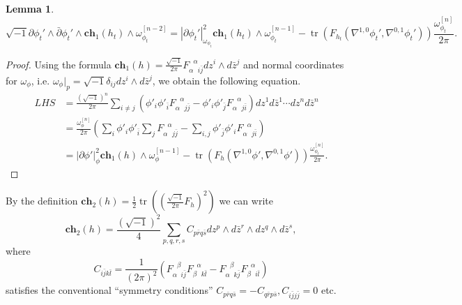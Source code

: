 \documentclass[10pt, letterpaper]{amsart}
\newcommand{\tr}{\operatorname{tr}}
\theoremstyle{plain}
\newtheorem{lemma}[theorem]{Lemma}
\theoremstyle{definition}
\numberwithin{equation}{section}
\begin{document}
\begin{lemma}	
	\label{lem:firstChern}
	\[
	\sqrt{-1}\partial\phi_t'\wedge \bar\partial \phi_t'\wedge \mathbf{ch}_1\left(h_t\right)\wedge \omega_{\phi_t}^{[n-2]}
	=
	\left|\partial \phi_t'\right|_{\omega_{\phi_t}}^2 \mathbf{ch}_1\left(h_t\right)\wedge \omega_{\phi_t}^{[n-1]}
	- 
 \tr \left( F_{h_t}\left(\nabla^{1,0}\phi_t', \nabla^{0,1}\phi_t'\right)\right)\frac{\omega_{\phi_t}^{[n]}}{2\pi }.
	\]
\end{lemma}

\begin{proof}
	Using the formula $\mathbf{ch}_1\left(h\right)= \frac{\sqrt{-1}}{2\pi} F_{\alpha\phantom{\alpha}i\bar j}^{\phantom{\alpha}\alpha}dz^i\wedge d\bar z^j$  and normal coordinates for $\omega_\phi$, i.e. $\omega_{\phi}|_p=\sqrt{-1}\delta_{ij}dz^i\wedge d\bar z^j$, we obtain the following equation.
	\begin{align*}
	LHS
	& = \frac{\left(\sqrt{-1}\right)^n}{2\pi}\sum_{i\neq j}\left( \phi'_i\phi'_{\bar i} F_{\alpha\phantom{\alpha}j\bar j}^{\phantom{\alpha}\alpha}
	-\phi'_i\phi'_{\bar j}F_{\alpha\phantom{\alpha}j\bar i}^{\phantom{\alpha}\alpha}
	\right)dz^1d\bar z^1\cdots dz^nd\bar z^n\\
	& = 
	\frac{\omega_\phi^{[n]}}{2\pi }
	\left( 
	\sum_i \phi'_i \phi'_{\bar i} \sum_j F_{\alpha\phantom{\alpha}j\bar j}^{\phantom{\alpha}\alpha}
	-
	\sum_{i,j}
	\phi'_{\bar j} \phi'_iF_{\alpha\phantom{\alpha}j\bar i}^{\phantom{\alpha}\alpha}\right)\\
	& = 
	\left|\partial \phi'\right|_{\phi}^2 \mathbf{ch}_1\left(h\right)\wedge \omega_{\phi}^{[n-1]}
	- 
	\tr \left( F_{h}\left(\nabla^{1,0}\phi',\nabla^{0,1}\phi'\right)\right) \frac{\omega_{\phi_t}^{[n]}}{2\pi }.
	\end{align*}
\end{proof}

By the definition $\mathbf{ch}_2\left(h\right)=\frac{1}{2}\tr \left(\left(\frac{\sqrt{-1}}{2\pi}F_{h}\right)^2\right)$ we can write
\[
\mathbf{ch}_2\left(h\right)
= 
\frac{\left(\sqrt{-1}\right)^2}{4}\sum_{p,q,r,s} C_{p\bar rq\bar s}dz^p\wedge d\bar z^r\wedge dz^q \wedge d\bar z^s,
\]
where
\[
C_{i\bar j k\bar l}
= 
\frac{1}{\left(2\pi\right)^2} 
\left( F_{\alpha\phantom{\beta}i\bar j}^{\phantom{\alpha}\beta}
F_{\beta\phantom{\alpha}k\bar l}^{\phantom{\beta}\alpha}
- 
F_{\alpha\phantom{\beta}k\bar j}^{\phantom{\alpha}\beta}
F_{\beta\phantom{\alpha}i\bar l}^{\phantom{\beta}\alpha}\right)
\]
satisfies the conventional ``symmetry conditions'' $C_{p\bar r q\bar s}=-C_{q\bar r p\bar s}, C_{i\bar jj\bar j}=0$ etc.
\end{document}
